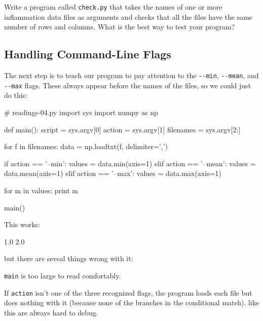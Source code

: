 \documentclass{book}
\begin{document}
\begin{challenge}
  Write a program called \texttt{check.py} that takes the names of one
  or more inflammation data files as arguments and checks that all the
  files have the same number of rows and columns. What is the best way
  to test your program?
\end{challenge}

\subsection{Handling Command-Line Flags}

The next step is to teach our program to pay attention to the
\texttt{-{}-min}, \texttt{-{}-mean}, and \texttt{-{}-max} flags. These
always appear before the names of the files, so we could just do this:

\begin{VerbIn}
# readings-04.py
import sys
import numpy as np

def main():
    script = sys.argv[0]
    action = sys.argv[1]
    filenames = sys.argv[2:]

    for f in filenames:
        data = np.loadtxt(f, delimiter=',')

        if action == '--min':
            values = data.min(axis=1)
        elif action == '--mean':
            values = data.mean(axis=1)
        elif action == '--max':
            values = data.max(axis=1)

        for m in values:
            print m

main()
\end{VerbIn}

This works:


\begin{VerbOut}
1.0
2.0
\end{VerbOut}

but there are seveal things wrong with it:

\begin{swcenumerate}
\item
  \texttt{main} is too large to read comfortably.
\item
  If \texttt{action} isn't one of the three recognized flags, the
  program loads each file but does nothing with it (because none of the
  branches in the conditional match).  like this are always hard to debug.
\end{swcenumerate}
\end{document}
